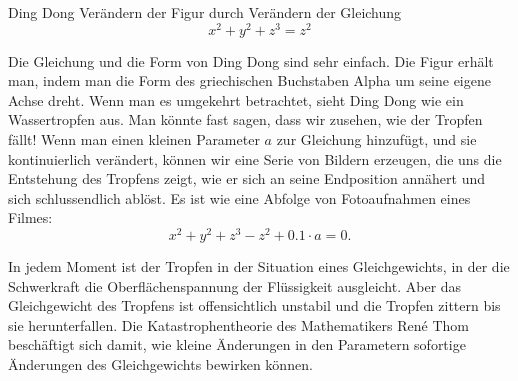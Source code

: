 \begin{surferPage}{Ding Dong}
Ver\"andern der Figur durch Verändern der Gleichung \\

\smallskip
\[x^2	+ y^2	+ z^3	= z^2\]

\singlespacing
Die Gleichung und die Form von Ding Dong sind sehr einfach. Die Figur erhält man, indem man die Form des griechischen Buchstaben Alpha um seine eigene Achse dreht. Wenn man es umgekehrt betrachtet, sieht Ding Dong wie ein Wassertropfen aus. Man könnte fast sagen, dass wir zusehen, wie der Tropfen fällt!
\newline
Wenn man einen kleinen Parameter $a$ zur Gleichung hinzufügt, und sie kontinuierlich verändert, können wir eine Serie von Bildern erzeugen, die uns die Entstehung des Tropfens zeigt, wie er sich an seine Endposition annähert und sich schlussendlich ablöst. Es ist wie eine Abfolge von Fotoaufnahmen eines Filmes:
\[x^2	+ y^2	+ z^3	-z^2+0.1\cdot a=0.\]

In jedem Moment ist der Tropfen in der Situation eines Gleichgewichts, in der die Schwerkraft die Oberflächenspannung der Flüssigkeit ausgleicht. Aber das Gleichgewicht des Tropfens ist offensichtlich unstabil und die Tropfen zittern bis sie herunterfallen.
Die Katastrophentheorie des Mathematikers Ren\'e Thom beschäftigt sich damit, wie kleine Änderungen in den Parametern sofortige Änderungen des Gleichgewichts bewirken können.
\end{surferPage}
